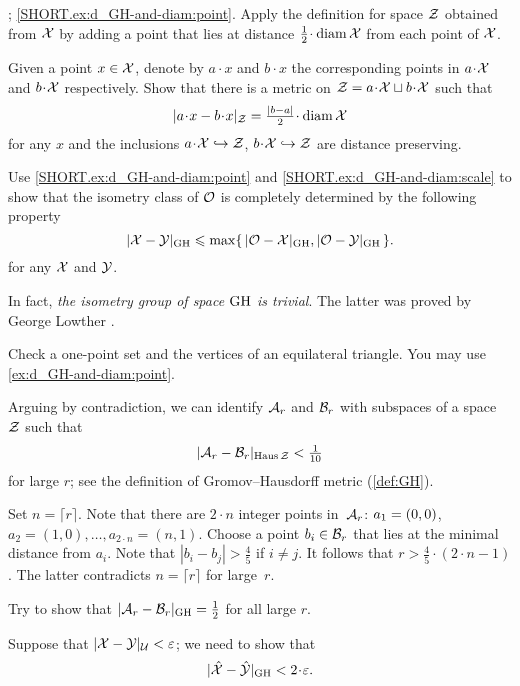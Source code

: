 
\parbf{\ref{ex:d_GH-and-diam}};
\ref{SHORT.ex:d_GH-and-diam:point}.
Apply the definition for space $\mathcal{Z}$ obtained from $\mathcal{X}$ by adding a point that lies at distance $\tfrac12\cdot\diam \spc{X}$ from each point of $\mathcal{X}$.

Given a point $x\in\mathcal{X}$, denote by $a\cdot x$ and $b\cdot x$ the corresponding points in $a\cdot\spc{X}$ and $b\cdot \spc{X}$ respectively.
Show that there is a metric on $\spc{Z}\z=a\cdot\spc{X}\sqcup b\cdot\spc{X}$ such that 
\[|a\cdot x-b\cdot x|_{\spc{Z}}=\tfrac{|b-a|}2\cdot\diam\spc{X}\]
for any $x$ and the inclusions
$a\cdot\spc{X}\hookrightarrow\spc{Z}$,
$b\cdot\spc{X}\hookrightarrow\spc{Z}$ are distance preserving.

Use \ref{SHORT.ex:d_GH-and-diam:point} and \ref{SHORT.ex:d_GH-and-diam:scale} to show that the isometry class of $\mathcal{O}$ is completely determined by the following property
\[|\mathcal{X}-\mathcal{Y}|_{\operatorname{\rm GH}\nolimits} \leqslant \max\{\,|\mathcal{O}-\mathcal{X}|_{\operatorname{\rm GH}\nolimits},|\mathcal{O}-\mathcal{Y}|_{\operatorname{\rm GH}\nolimits}\,\}.\]
for any $\mathcal{X}$ and $\mathcal{Y}$.

In fact, \textit{the isometry group of space $\operatorname{\rm GH}\nolimits$ is trivial}.
The latter was proved by George Lowther \cite{lowther, ivanov-tuzhilin}.

Check a one-point set and the vertices of an equilateral triangle.
You may use \ref{ex:d_GH-and-diam:point}.


Arguing by contradiction,
we can identify $\mathcal{A}_r$ and $\mathcal{B}_r$ with subspaces of a space $\mathcal{Z}$
such that 
\[|\mathcal{A}_r-\mathcal{B}_r|_{\operatorname{\rm Haus}\nolimits \mathcal{Z}}<\tfrac1{10}\]
for large $r$; see the definition of Gromov--Hausdorff metric (\ref{def:GH}).

Set $n=\lceil r \rceil$.
Note that there are $2\cdot n$ integer points in~$\mathcal{A}_r$: 
$a_1\z=(0,0)$, $a_2=(1,0),\dots,a_{2\cdot n}=(n,1)$.
Choose a point $b_i\in \mathcal{B}_r$ that lies at the minimal distance from $a_i$.
Note that $|b_i-b_j|>\tfrac 45$ if $i\ne j$.
It follows that $r>\tfrac 45\cdot (2\cdot n-1)$.
The latter contradicts $n=\lceil r \rceil$ for large~$r$.

Try to show that $|\mathcal{A}_r-\mathcal{B}_r|_{\operatorname{\rm GH}\nolimits}=\tfrac12$ for all large $r$.

\setcounter{eqtn}{0}

Suppose that $|\mathcal{X}-\mathcal{Y}|_{\mathcal{U}}<\varepsilon$;
we need to show that 
\[|\hat{\spc{X}}-\hat{\spc{Y}}|_{\GH}<2\cdot \eps.\]

